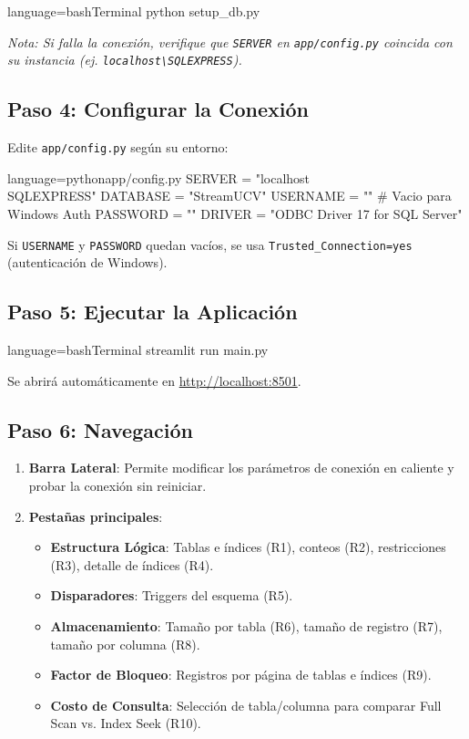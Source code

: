 \documentclass[11pt,a4paper]{article}
\begin{document}
\begin{codeblocklang}{language=bash}{Terminal}
python setup_db.py
\end{codeblocklang}
\textit{Nota: Si falla la conexión, verifique que \texttt{SERVER} en \texttt{app/config.py} coincida con su instancia (ej. \texttt{localhost\textbackslash SQLEXPRESS}).}

\subsection{Paso 4: Configurar la Conexión}
Edite \texttt{app/config.py} según su entorno:
\begin{codeblocklang}{language=python}{app/config.py}
SERVER = "localhost\\SQLEXPRESS"
DATABASE = "StreamUCV"
USERNAME = ""       # Vacio para Windows Auth
PASSWORD = ""
DRIVER = "ODBC Driver 17 for SQL Server"
\end{codeblocklang}
Si \texttt{USERNAME} y \texttt{PASSWORD} quedan vacíos, se usa \texttt{Trusted\_Connection=yes} (autenticación de Windows).

\subsection{Paso 5: Ejecutar la Aplicación}
\begin{codeblocklang}{language=bash}{Terminal}
streamlit run main.py
\end{codeblocklang}
Se abrirá automáticamente en \url{http://localhost:8501}.

\subsection{Paso 6: Navegación}
\begin{enumerate}
    \item \textbf{Barra Lateral}: Permite modificar los parámetros de conexión en caliente y probar la conexión sin reiniciar.
    \item \textbf{Pestañas principales}:
    \begin{itemize}
        \item \textbf{Estructura Lógica}: Tablas e índices (R1), conteos (R2), restricciones (R3), detalle de índices (R4).
        \item \textbf{Disparadores}: Triggers del esquema (R5).
        \item \textbf{Almacenamiento}: Tamaño por tabla (R6), tamaño de registro (R7), tamaño por columna (R8).
        \item \textbf{Factor de Bloqueo}: Registros por página de tablas e índices (R9).
        \item \textbf{Costo de Consulta}: Selección de tabla/columna para comparar Full Scan vs. Index Seek (R10).
    \end{itemize}
\end{enumerate}
\end{document}
